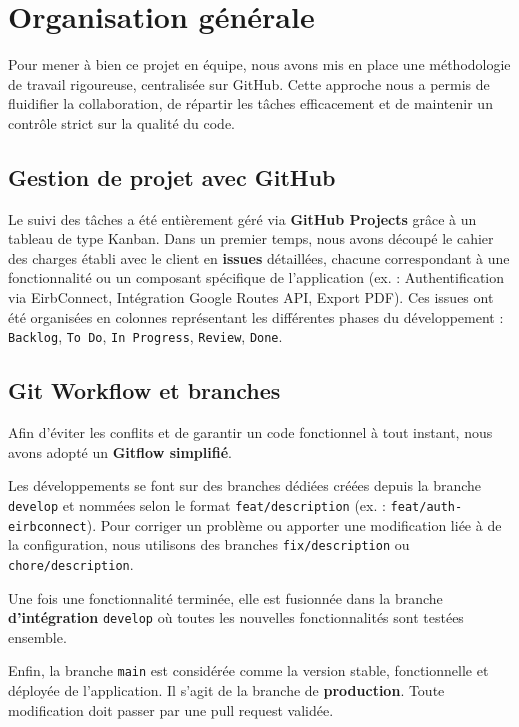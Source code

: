 \documentclass[11pt,a4paper]{article}
\begin{document}
\section{Organisation générale}

Pour mener à bien ce projet en équipe, nous avons mis en place une méthodologie de travail rigoureuse, centralisée sur GitHub. Cette approche nous a permis de fluidifier la collaboration, de répartir les tâches efficacement et de maintenir un contrôle strict sur la qualité du code.

\subsection{Gestion de projet avec GitHub}

Le suivi des tâches a été entièrement géré via \textbf{GitHub Projects} grâce à un tableau de type Kanban. Dans un premier temps, nous avons découpé le cahier des charges établi avec le client en \textbf{issues} détaillées, chacune correspondant à une fonctionnalité ou un composant spécifique de l'application (ex. : \og Authentification via EirbConnect\fg{}, \og Intégration Google Routes API\fg{}, \og Export PDF\fg{}). Ces issues ont été organisées en colonnes représentant les différentes phases du développement : \texttt{Backlog}, \texttt{To Do}, \texttt{In Progress}, \texttt{Review}, \texttt{Done}.

\subsection{Git Workflow et branches}

Afin d'éviter les conflits et de garantir un code fonctionnel à tout instant, nous avons adopté un \textbf{Gitflow simplifié}.

Les développements se font sur des branches dédiées créées depuis la branche \texttt{develop} et nommées selon le format \texttt{feat/description} (ex. : \texttt{feat/auth-eirbconnect}). Pour corriger un problème ou apporter une modification liée à de la configuration, nous utilisons des branches \texttt{fix/description} ou \texttt{chore/description}.

Une fois une fonctionnalité terminée, elle est fusionnée dans la branche \textbf{d'intégration} \texttt{develop} où toutes les nouvelles fonctionnalités sont testées ensemble.

Enfin, la branche \texttt{main} est considérée comme la version stable, fonctionnelle et déployée de l'application. Il s'agit de la branche de \textbf{production}. Toute modification doit passer par une pull request validée.
\end{document}

